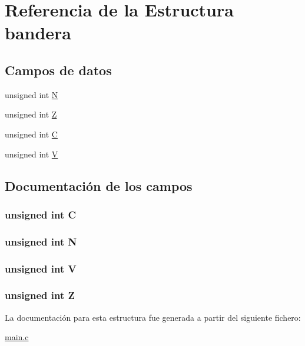 \hypertarget{structbandera}{}\section{Referencia de la Estructura bandera}
\label{structbandera}
\subsection*{Campos de datos}
\begin{DoxyCompactItemize}
\item 
unsigned int \hyperlink{structbandera_ae8b170dcb376fe60270f4675f84e4477}{N}
\item 
unsigned int \hyperlink{structbandera_a8e547e942fb5a765f2f81a5c9decce93}{Z}
\item 
unsigned int \hyperlink{structbandera_a2875ae5a278ae3423aa492f9810707be}{C}
\item 
unsigned int \hyperlink{structbandera_ad4a5f70723d0035c82b07a12b8ec5780}{V}
\end{DoxyCompactItemize}


\subsection{Documentación de los campos}
\hypertarget{structbandera_a2875ae5a278ae3423aa492f9810707be}{}
\subsubsection[{C}]{\setlength{\rightskip}{0pt plus 5cm}unsigned int C}\label{structbandera_a2875ae5a278ae3423aa492f9810707be}
\hypertarget{structbandera_ae8b170dcb376fe60270f4675f84e4477}{}
\subsubsection[{N}]{\setlength{\rightskip}{0pt plus 5cm}unsigned int N}\label{structbandera_ae8b170dcb376fe60270f4675f84e4477}
\hypertarget{structbandera_ad4a5f70723d0035c82b07a12b8ec5780}{}
\subsubsection[{V}]{\setlength{\rightskip}{0pt plus 5cm}unsigned int V}\label{structbandera_ad4a5f70723d0035c82b07a12b8ec5780}
\hypertarget{structbandera_a8e547e942fb5a765f2f81a5c9decce93}{}
\subsubsection[{Z}]{\setlength{\rightskip}{0pt plus 5cm}unsigned int Z}\label{structbandera_a8e547e942fb5a765f2f81a5c9decce93}


La documentación para esta estructura fue generada a partir del siguiente fichero\+:\begin{DoxyCompactItemize}
\item 
\hyperlink{main_8c}{main.\+c}\end{DoxyCompactItemize}
